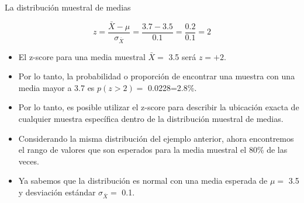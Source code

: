 \documentclass{beamer}
\begin{document}
\begin{frame}{La distribución muestral de medias}
	\begin{center}
	\end{center}
	$$z=\dfrac{\bar{X}-\mu}{\sigma_{\bar{X}}}=\dfrac{3.7-3.5}{0.1}=\dfrac{0.2}{0.1}=2$$
\end{frame}

\begin{frame}
\begin{itemize}
\justifying
\item El z-score para una media muestral $\bar{X}=$ 3.5 será $z=+2$.
\item Por lo tanto, la probabilidad o proporción de encontrar una muestra con una media mayor a 3.7 es $p(z>2)=$ 0.0228=2.8\%.
\item Por lo tanto, es posible utilizar el z-score para describir la ubicación exacta de cualquier muestra específica  dentro de la distribución muestral de medias.
\item Considerando la misma distribución del ejemplo anterior, ahora encontremos el rango de valores que son esperados para la media muestral el 80\% de las veces. 
\item Ya sabemos que la distribución es normal con una media esperada de $\mu=$ 3.5 y desviación estándar $\sigma_{\bar{X}}=$ 0.1.
\end{itemize}
\end{frame}
\end{document}
